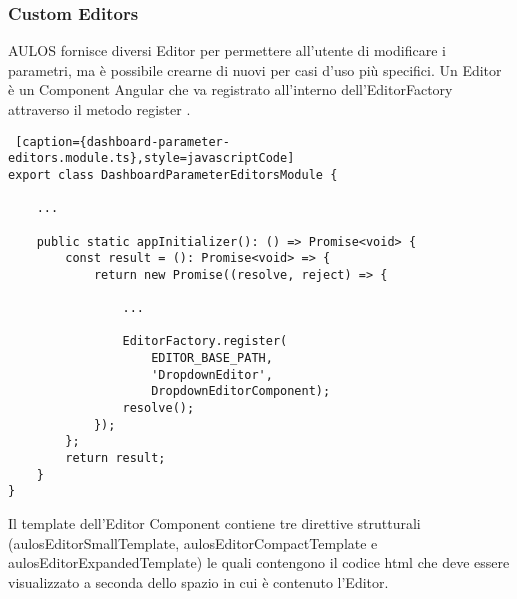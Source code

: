 \subsubsection{Custom Editors}
AULOS fornisce diversi Editor per permettere all'utente di modificare i parametri, ma è possibile crearne di nuovi per casi d'uso più specifici. Un Editor è un Component Angular che va registrato all'interno dell'EditorFactory attraverso il metodo register .\\
\begin{lstlisting} [caption={dashboard-parameter-editors.module.ts},style=javascriptCode]
export class DashboardParameterEditorsModule {

    ...

    public static appInitializer(): () => Promise<void> {
        const result = (): Promise<void> => {
            return new Promise((resolve, reject) => {
            
                ...
                
                EditorFactory.register(
                    EDITOR_BASE_PATH,
                    'DropdownEditor',
                    DropdownEditorComponent);
                resolve();
            });
        };
        return result;
    }
}
\end{lstlisting}
Il template dell'Editor Component contiene tre direttive strutturali (aulosEditorSmallTemplate, aulosEditorCompactTemplate e aulosEditorExpandedTemplate) le quali contengono il codice html che deve essere visualizzato a seconda dello spazio in cui è contenuto l'Editor.

